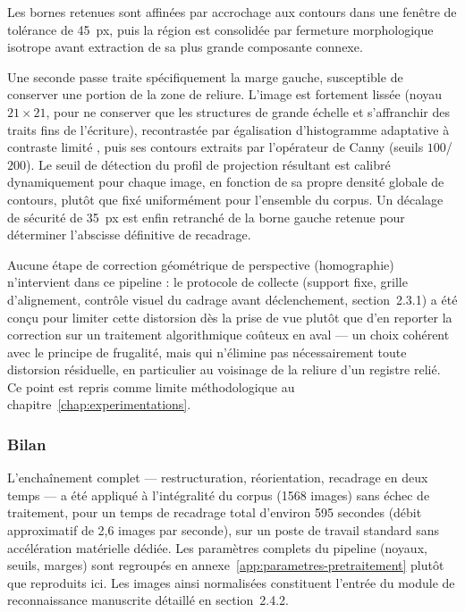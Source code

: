 Les bornes retenues sont affinées par accrochage aux contours dans une fenêtre de tolérance de 45~px, puis la région est consolidée par fermeture morphologique isotrope avant extraction de sa plus grande composante connexe.

Une seconde passe traite spécifiquement la marge gauche, susceptible de conserver une portion de la zone de reliure.
L'image est fortement lissée (noyau $21\times21$, pour ne conserver que les structures de grande échelle et s'affranchir des traits fins de l'écriture), recontrastée par égalisation d'histogramme adaptative à contraste limité \cite{zuiderveld1994clahe}, puis ses contours extraits par l'opérateur de Canny (seuils $100$/$200$).
Le seuil de détection du profil de projection résultant est calibré dynamiquement pour chaque image, en fonction de sa propre densité globale de contours, plutôt que fixé uniformément pour l'ensemble du corpus.
Un décalage de sécurité de 35~px est enfin retranché de la borne gauche retenue pour déterminer l'abscisse définitive de recadrage.

Aucune étape de correction géométrique de perspective (homographie) n'intervient dans ce pipeline : le protocole de collecte (support fixe, grille d'alignement, contrôle visuel du cadrage avant déclenchement, section~2.3.1) a été conçu pour limiter cette distorsion dès la prise de vue plutôt que d'en reporter la correction sur un traitement algorithmique coûteux en aval --- un choix cohérent avec le principe de frugalité, mais qui n'élimine pas nécessairement toute distorsion résiduelle, en particulier au voisinage de la reliure d'un registre relié. Ce point est repris comme limite méthodologique au chapitre~\ref{chap:experimentations}.

\subsubsection*{Bilan}

L'enchaînement complet --- restructuration, réorientation, recadrage en deux temps --- a été appliqué à l'intégralité du corpus (1568 images) sans échec de traitement, pour un temps de recadrage total d'environ 595 secondes (débit approximatif de 2,6 images par seconde), sur un poste de travail standard sans accélération matérielle dédiée.
Les paramètres complets du pipeline (noyaux, seuils, marges) sont regroupés en annexe~\ref{app:parametres-pretraitement} plutôt que reproduits ici. Les images ainsi normalisées constituent l'entrée du module de reconnaissance manuscrite détaillé en section~2.4.2.

